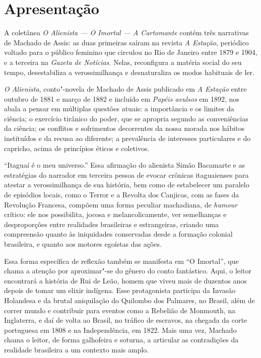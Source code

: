 \chapter{Apresentação}

A coletânea \emph{O Alienista — O Imortal — A Cartomante} contém três
narrativas de Machado de Assis: as duas primeiras saíram na revista
\emph{A Estação}, periódico voltado para o público feminino que circulou
no Rio de Janeiro entre 1879 e 1904, e a terceira na \emph{Gazeta de
Notícias}. Nelas, reconfigura a matéria social do seu tempo,
desestabiliza a verossimilhança e desnaturaliza os modos habituais de
ler.

\emph{O Alienista}, conto"-novela de Machado de Assis publicado em
\emph{A Estação} entre outubro de 1881 e março de 1882 e incluído em
\emph{Papéis avulsos} em 1892, nos abala a pensar em múltiplas questões
atuais: a importância e os limites da ciência; o exercício tirânico do
poder, que se apropria segundo as conveniências da ciência; os conflitos
e sofrimentos decorrentes da nossa morada nos hábitos instituídos e da
recusa ao diferente; a prevalência de interesses particulares e do
capricho, acima de princípios éticos e coletivos.

``Itaguaí é o meu universo.'' Essa afirmação do alienista Simão
Bacamarte e as estratégias do narrador em terceira pessoa de evocar
crônicas itaguaienses para atestar a verossimilhança de sua história,
bem como de estabelecer um paralelo de episódios locais, como o Terror e
a Revolta dos Canjicas, com as fases da Revolução Francesa, compõem uma
forma peculiar machadiana, de \emph{humour} crítico: ele nos
possibilita, jocosa e melancolicamente, ver semelhanças e desproporções
entre realidades brasileiras e estrangeiras, criando uma compreensão
quanto às iniquidades conservadas desde a formação colonial brasileira,
e quanto aos motores egoístas das ações.

Essa forma específica de reflexão também se manifesta em ``O Imortal'',
que chama a atenção por aproximar"-se do gênero do conto fantástico.
Aqui, o leitor encontrará a história de Rui de Leão, homem que viveu
mais de duzentos anos depois de tomar um elixir indígena. Esse
protagonista participa da Invasão Holandesa e da brutal aniquilação do
Quilombo dos Palmares, no Brasil, além de correr mundo e contribuir para
eventos como a Rebelião de Monmouth, na Inglaterra, e daí de volta ao
Brasil, no tráfico de escravos, na chegada da corte portuguesa em 1808 e
na Independência, em 1822. Mais uma vez, Machado chama o leitor, de
forma galhofeira e soturna, a articular as contradições da realidade
brasileira a um contexto mais amplo.

